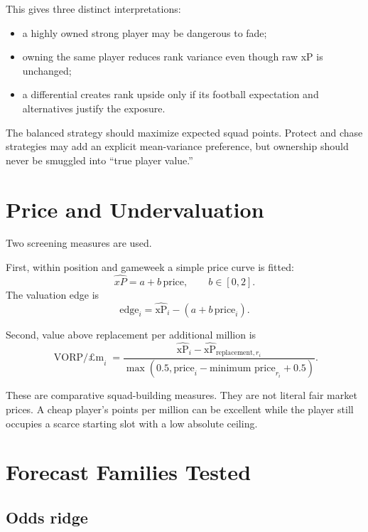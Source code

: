\documentclass[11pt,a4paper]{article}
\newcommand{\xp}{\widehat{\mathrm{xP}}}
\begin{document}
This gives three distinct interpretations:
\begin{itemize}
  \item a highly owned strong player may be dangerous to fade;
  \item owning the same player reduces rank variance even though raw xP is unchanged;
  \item a differential creates rank upside only if its football expectation and alternatives justify the exposure.
\end{itemize}

The balanced strategy should maximize expected squad points. Protect and chase strategies may add an explicit mean-variance preference, but ownership should never be smuggled into ``true player value.''

\section{Price and Undervaluation}

Two screening measures are used.

First, within position and gameweek a simple price curve is fitted:
\begin{equation}
  \widehat{xP}=a+b\,\text{price},\qquad b\in[0,2].
\end{equation}
The valuation edge is
\begin{equation}
  \text{edge}_i=\xp_i-(a+b\,\text{price}_i).
\end{equation}

Second, value above replacement per additional million is
\begin{equation}
  \operatorname{VORP/\pounds m}_i=
  \frac{\xp_i-\xp_{\text{replacement},r_i}}
  {\max(0.5,\text{price}_i-\text{minimum price}_{r_i}+0.5)}.
\end{equation}

These are comparative squad-building measures. They are not literal fair market prices. A cheap player's points per million can be excellent while the player still occupies a scarce starting slot with a low absolute ceiling.

\section{Forecast Families Tested}

\subsection{Odds ridge}
\end{document}
